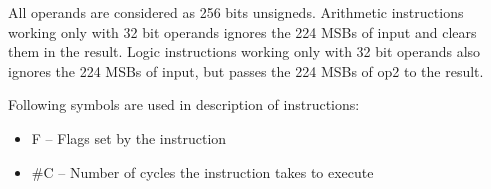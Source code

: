 \documentclass{tropic_design_spec}
\begin{document}

All operands are considered as 256 bits unsigneds. Arithmetic instructions working only with 32 bit
operands ignores the 224 MSBs of input and clears them in the result. Logic instructions
working only with 32 bit operands also ignores the 224 MSBs of input, but passes the 224 MSBs of op2
to the result.





Following symbols are used in description of instructions:
\begin{itemize}
    \item{F -- Flags set by the instruction}
    \item{\#C -- Number of cycles the instruction takes to execute}
\end{itemize}
\end{document}
